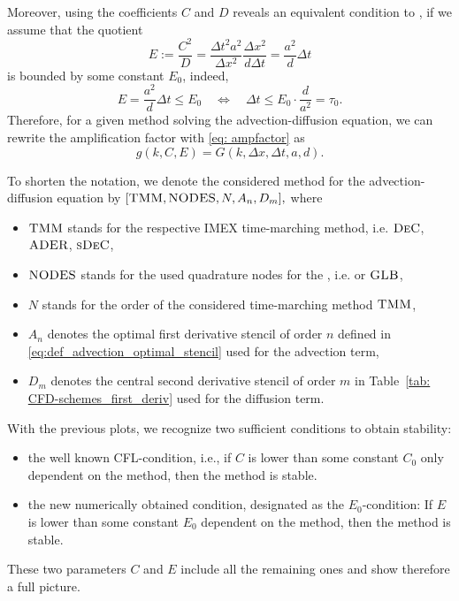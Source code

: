 Moreover, using the coefficients $C$ and $D$ reveals an equivalent condition to \cite{TanChenShu_ImEx_Stability}, if we assume that the quotient
\begin{equation*}
E:=\frac{C^2}{D}= \frac{ \Delta t ^2 a^2 }{\Delta x^2} \frac{\Delta x^2}{d \Delta t} = \frac{a^2}{d}\Delta t
\end{equation*}
is bounded by some constant $E_0$, indeed,
\begin{equation*}
E= \frac{a^2}{d}\Delta t\le E_0 \quad \Longleftrightarrow \quad \Delta t \le E_0 \cdot \frac{d}{a^2}=\tau_0.
\end{equation*}
Therefore, for a given method solving the advection-diffusion equation, we can rewrite the amplification factor  with \eqref{eq: ampfactor} as
\begin{equation}
	g(k,C,E)=G(k,\Delta x, \Delta t, a,d).
\end{equation}

\begin{definition}	\label{defi: notation_pde_method}
	To shorten the notation, we denote the considered method for the advection-diffusion equation by $[\textsc{TMM},\textsc{NODES},N, A_n,D_m],$ where
	\begin{itemize}
		\item $\textsc{TMM}$ stands for the respective IMEX time-marching method, i.e. $\textsc{DeC}$, $\textsc{ADER}$, $\textsc{sDeC}$,
		\item $\textsc{NODES}$ stands for the used quadrature nodes for the \TMM, i.e. {\eq} or $\textsc{GLB}$,
		\item $N$ stands for the order of the considered time-marching method $\textsc{TMM}$,
		\item $A_n$ denotes the optimal first derivative stencil of order $n$ defined in \eqref{eq:def_advection_optimal_stencil} used for the advection term,
		\item $D_m$ denotes the central second derivative stencil of order $m$ in Table~\ref{tab: CFD-schemes_first_deriv} used for the diffusion term.
	\end{itemize}
\end{definition}


\begin{remark}
	With the previous plots, we recognize two sufficient conditions to obtain stability:
	\begin{itemize}
		\item the well known CFL-condition, i.e., if $C$ is lower than some constant $C_0$ only dependent on the method, then the method is stable.
		\item the new numerically obtained condition, designated as the $E_0$-condition: If $E$ is lower than some constant $E_0$ dependent on the method, then the method is stable.
	\end{itemize}
	
	These two parameters $C$ and $E$ include all the remaining ones and show therefore a full picture.
\end{remark}

